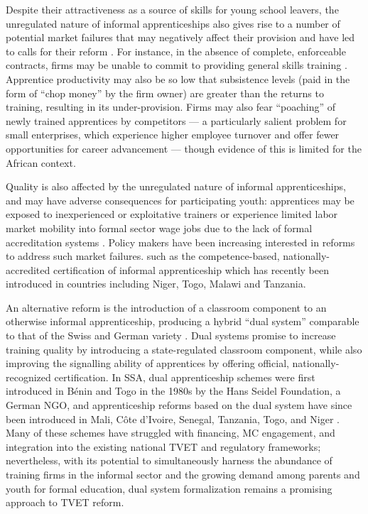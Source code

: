 \documentclass[
  a4paper, twoside, 12pt]{book}
\begin{document}
Despite their attractiveness as a source of skills for young school leavers, the unregulated nature of informal apprenticeships also gives rise to a number of potential market failures that may negatively affect their provision and have led to calls for their reform \autocite{walther2011}. For instance, in the absence of complete, enforceable contracts, firms may be unable to commit to providing general skills training \autocite{acemoglu1998,acemoglu1999,dustmann2012}. Apprentice productivity may also be so low that subsistence levels (paid in the form of ``chop money'' by the firm owner) are greater than the returns to training, resulting in its under-provision. Firms may also fear ``poaching'' of newly trained apprentices by competitors --- a particularly salient problem for small enterprises, which experience higher employee turnover and offer fewer opportunities for career advancement \autocite{mcintosh2011} --- though evidence of this is limited for the African context.

Quality is also affected by the unregulated nature of informal apprenticeships, and may have adverse consequences for participating youth: apprentices may be exposed to inexperienced or exploitative trainers or experience limited labor market mobility into formal sector wage jobs due to the lack of formal accreditation systems \autocite{acemoglu2000,worldbank2018,alfonsi2020,hofmann2022}. Policy makers have been increasing interested in reforms to address such market failures. such as the competence-based, nationally-accredited certification of informal apprenticeship which has recently been introduced in countries including Niger, Togo, Malawi and Tanzania.

An alternative reform is the introduction of a classroom component to an otherwise informal apprenticeship, producing a hybrid ``dual system'' comparable to that of the Swiss and German variety \autocite{walther2011}. Dual systems promise to increase training quality by introducing a state-regulated classroom component, while also improving the signalling ability of apprentices by offering official, nationally-recognized certification. In SSA, dual apprenticeship schemes were first introduced in Bénin and Togo in the 1980s by the Hans Seidel Foundation, a German NGO, and apprenticeship reforms based on the dual system have since been introduced in Mali, Côte d'Ivoire, Senegal, Tanzania, Togo, and Niger \autocite{walther2011,ilo2020a}. Many of these schemes have struggled with financing, MC engagement, and integration into the existing national TVET and regulatory frameworks; nevertheless, with its potential to simultaneously harness the abundance of training firms in the informal sector and the growing demand among parents and youth for formal education, dual system formalization remains a promising approach to TVET reform.
\end{document}

